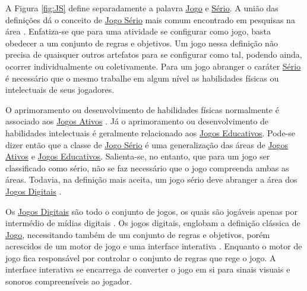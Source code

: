 \vspace{-0,4cm}

A Figura \ref{fig:JS} define separadamente a palavra \underline{Jo}g\underline{o} e \underline{Sério}. A união das definições dá o conceito de \underline{Jo}g\underline{o Sério} mais comum encontrado em pesquisas na área \cite{michael2005serious}. Enfatiza-se que para uma atividade se configurar como jogo, basta obedecer a um conjunto de regras e objetivos. Um jogo nessa definição não precisa de quaisquer outros artefatos para se configurar como tal, podendo ainda, ocorrer individualmente ou coletivamente. Para um jogo abranger o caráter \underline{Sério} é necessário que o mesmo trabalhe em algum nível as habilidades físicas ou intelectuais de seus jogadores. 

\vspace{-0,1cm}

O aprimoramento ou desenvolvimento de habilidades físicas normalmente é associado aos \underline{Jo}g\underline{os Ativos} \cite{araujo2017exergames, schroeder2017wobu}. Já o aprimoramento ou desenvolvimento de habilidades intelectuais é geralmente relacionado aos \underline{Jo}g\underline{os Educativos}. Pode-se dizer então que a classe de \underline{Jo}g\underline{o Sério} é uma generalização das áreas de \underline{Jo}g\underline{os Ativos} e \underline{Jo}g\underline{os Educativos}. Salienta-se, no entanto, que para um jogo ser classificado como sério, não se faz necessário que o jogo compreenda ambas as áreas. Todavia, na definição mais aceita, um jogo sério deve abranger a área dos  \underline{Jo}g\underline{os Di}g\underline{itais} \cite{laamarti2014overview}.


\vspace{-0,1cm}

Os \underline{Jo}g\underline{os Di}g\underline{itais} são todo o conjunto de jogos, os quais são jogáveis apenas por intermédio de mídias digitais \cite{lucchese2009conceituaccao}. Os jogos digitais, englobam a definição clássica de \underline{Jo}g\underline{o}, necessitando também de um conjunto de regras e objetivos, porém acrescidos de um motor de jogo e uma interface interativa \cite{battaiola2000jogos}. Enquanto o motor de jogo fica responsável por controlar o conjunto de regras que rege o jogo. A interface interativa se encarrega de converter o jogo em si para sinais visuais e sonoros compreensíveis ao jogador.

